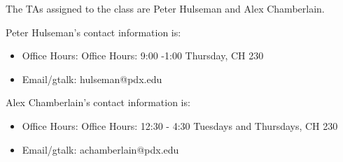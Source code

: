 The TAs assigned to the class are Peter Hulseman and Alex Chamberlain. 

Peter Hulseman's contact information is:
\begin{itemize}
\item Office Hours: Office Hours: 9:00 -1:00 Thursday, CH 230
\item Email/gtalk: hulseman@pdx.edu
\end{itemize}

Alex Chamberlain's contact information is:
\begin{itemize}
\item Office Hours: Office Hours: 12:30 - 4:30 Tuesdays and Thursdays, CH 230
\item Email/gtalk: achamberlain@pdx.edu
\end{itemize}
